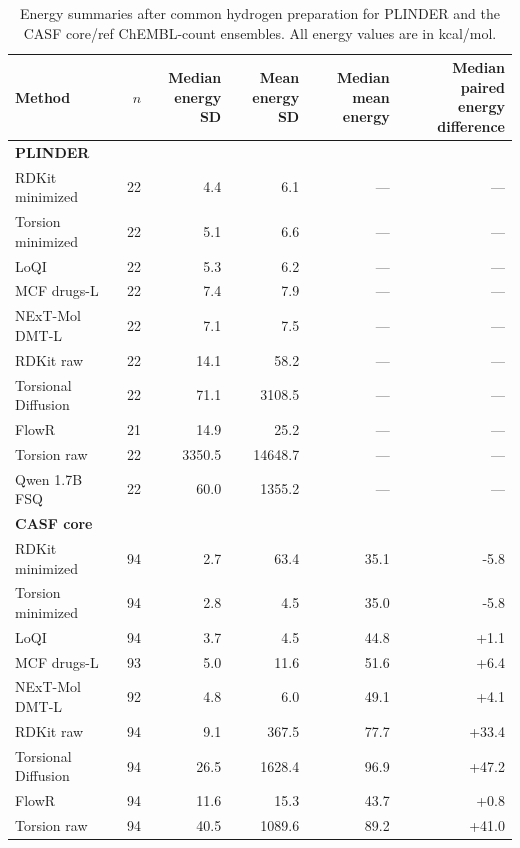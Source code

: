 \begin{table}[p]
\centering\footnotesize
\setlength{\tabcolsep}{3pt}
\renewcommand{\arraystretch}{1.12}
\caption{Energy summaries after common hydrogen preparation for PLINDER and the CASF core/ref ChEMBL-count ensembles. All energy values are in kcal/mol.}
\label{tab:energy-summary}
\begin{tabular*}{\linewidth}{@{\extracolsep{\fill}}lrrrrr@{}}
\toprule
Method & $n$ & \shortstack{Median\\energy SD} & \shortstack{Mean\\energy SD} & \shortstack{Median\\mean energy} & \shortstack{Median paired\\energy difference} \\
\midrule
\multicolumn{6}{l}{\textbf{PLINDER}} \\
\midrule
RDKit minimized & 22 & 4.4 & 6.1 & --- & --- \\
Torsion minimized & 22 & 5.1 & 6.6 & --- & --- \\
LoQI & 22 & 5.3 & 6.2 & --- & --- \\
MCF drugs-L & 22 & 7.4 & 7.9 & --- & --- \\
NExT-Mol DMT-L & 22 & 7.1 & 7.5 & --- & --- \\
RDKit raw & 22 & 14.1 & 58.2 & --- & --- \\
Torsional Diffusion & 22 & 71.1 & 3108.5 & --- & --- \\
FlowR & 21 & 14.9 & 25.2 & --- & --- \\
Torsion raw & 22 & 3350.5 & 14648.7 & --- & --- \\
Qwen 1.7B FSQ & 22 & 60.0 & 1355.2 & --- & --- \\
\midrule
\multicolumn{6}{l}{\textbf{CASF core}} \\
\midrule
RDKit minimized & 94 & 2.7 & 63.4 & 35.1 & -5.8 \\
Torsion minimized & 94 & 2.8 & 4.5 & 35.0 & -5.8 \\
LoQI & 94 & 3.7 & 4.5 & 44.8 & +1.1 \\
MCF drugs-L & 93 & 5.0 & 11.6 & 51.6 & +6.4 \\
NExT-Mol DMT-L & 92 & 4.8 & 6.0 & 49.1 & +4.1 \\
RDKit raw & 94 & 9.1 & 367.5 & 77.7 & +33.4 \\
Torsional Diffusion & 94 & 26.5 & 1628.4 & 96.9 & +47.2 \\
FlowR & 94 & 11.6 & 15.3 & 43.7 & +0.8 \\
Torsion raw & 94 & 40.5 & 1089.6 & 89.2 & +41.0 \\

\end{tabular*}
\end{table}
